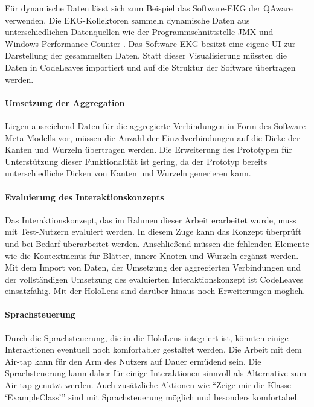 Für dynamische Daten lässt sich zum Beispiel das Software-EKG der QAware verwenden. Die EKG-Kollektoren sammeln dynamische Daten aus unterschiedlichen Datenquellen wie der Programmschnittstelle JMX und Windows Performance Counter \cite{weigend2011dynamische}. Das Software-EKG besitzt eine eigene UI zur Darstellung der gesammelten Daten. Statt dieser Visualisierung müssten die Daten in CodeLeaves importiert und auf die Struktur der Software übertragen werden.

\paragraph{Umsetzung der Aggregation}

Liegen ausreichend Daten für die aggregierte Verbindungen in Form des Software Meta-Modells vor, müssen die Anzahl der Einzelverbindungen auf die Dicke der Kanten und Wurzeln übertragen werden. Die Erweiterung des Prototypen für Unterstützung dieser Funktionalität ist gering, da der Prototyp bereits unterschiedliche Dicken von Kanten und Wurzeln generieren kann.

\paragraph{Evaluierung des Interaktionskonzepts}

Das Interaktionskonzept, das im Rahmen dieser Arbeit erarbeitet wurde, muss mit Test-Nutzern evaluiert werden. In diesem Zuge kann das Konzept überprüft und bei Bedarf überarbeitet werden. Anschließend müssen die fehlenden Elemente wie die Kontextmenüs für Blätter, innere Knoten und Wurzeln ergänzt werden.\\

Mit dem Import von Daten, der Umsetzung der aggregierten Verbindungen und der vollständigen Umsetzung des evaluierten Interaktionskonzept ist CodeLeaves einsatzfähig. Mit der HoloLens sind darüber hinaus noch Erweiterungen möglich.

\paragraph*{Sprachsteuerung}

Durch die Sprachsteuerung, die in die HoloLens integriert ist, könnten einige Interaktionen eventuell noch komfortabler gestaltet werden. Die Arbeit mit dem Air-tap kann für den Arm des Nutzers auf Dauer ermüdend sein. Die Sprachsteuerung kann daher für einige Interaktionen sinnvoll als Alternative zum Air-tap genutzt werden. Auch zusätzliche Aktionen wie "`Zeige mir die Klasse \enquote*{ExampleClass}"' sind mit Sprachsteuerung möglich und besonders komfortabel.

